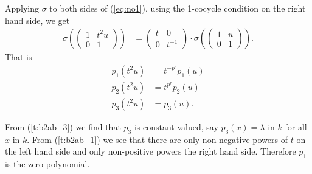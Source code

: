 	Applying $\sigma$ to both sides of (\ref{eq:no1}), using the 1-cocycle condition on the right hand side, we get
	\begin{align*}
	\sigma\left(
			\left(\begin{matrix} 1 & t^2u \\ 0 & 1\end{matrix}\right)
			\right) &=
	\left(\begin{matrix} t & 0 \\ 0 & t^{-1}  \end{matrix}\right) \cdot
	\sigma\left(
			\left(\begin{matrix} 1 & u \\ 0 & 1 \end{matrix}\right) 
			\right).
	\end{align*}
	That is
	\begin{align}
	\label{t:b2ab_1}
	p_1(t^2u) &= t^{-p^r} p_1(u) \\
							 \label{t:b2ab_2}
							 p_2(t^2u) &= t^{p^r}p_2(u) \\
														\label{t:b2ab_3}
														p_3(t^2u) &=  p_3(u).
														\end{align}

														From (\ref{t:b2ab_3}) we find that $p_3$ is constant-valued, say $p_3(x)=\lambda$ in $k$ for all $x$ in $k$. From (\ref{t:b2ab_1}) we see that there are only non-negative powers of $t$ on the left hand side and only non-positive powers the right hand side. Therefore $p_1$ is the zero polynomial.

